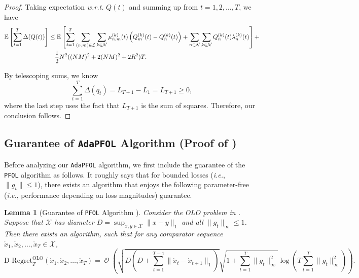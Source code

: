 \documentclass[11pt,fullpage,letterpaper]{article} %
\newtheorem{lemma}[theorem]{Lemma}
\renewcommand{\bm}[1]{#1}%
\renewcommand{\O}{\operatorname{\mathcal O}}
\newcommand{\E}{\operatornamewithlimits{\mathbb{E}}}
\newcommand{\mN}{{\mathcal N}}
\newcommand{\mL}{{\mathcal L}}
\newcommand{\OLOAlg}{\texttt{AdaPFOL}\xspace}
\begin{document}
\begin{proof}
Taking expectation \textit{w.r.t.} $\bm Q(t)$ and summing up from $t=1,2,\ldots,T$, we have
\begin{align*}
\E\left [\sum_{t=1}^T \Delta(\bm Q(t))\right ]&\le \E\left [\sum_{t=1}^T \sum_{(n,m)\in \mL} \sum_{k\in \mN} \mu_{n,m}^{(k)}(t)\left (Q_m^{(k)}(t)-Q_n^{(k)}(t)\right ) + \sum_{n\in \mN} \sum_{k\in \mN} Q_n^{(k)}(t) \lambda_n^{(k)}(t)\right ] + \nonumber \\
&\quad \frac 12 N^2 ((NM)^2+2(NM)^2+2R^2) T.
\end{align*}

By telescoping sums, we know
\begin{equation*}
\sum_{t=1}^T \Delta(\bm q_t)=L_{T+1}-L_1=L_{T+1}\ge 0,
\end{equation*}
where the last step uses the fact that $L_{T+1}$ is the sum of squares. Therefore, our conclusion follows.
\end{proof}

\subsection{Guarantee of \OLOAlg Algorithm (Proof of )}\label{sec:appendix cutkosky}
Before analyzing our \OLOAlg algorithm, we first include the guarantee of the \texttt{PFOL} algorithm \citep{cutkosky2020parameter} as follows. It roughly says that for bounded losses (\textit{i.e.}, $\lVert \bm g_t\rVert\le 1$), there exists an algorithm that enjoys the following parameter-free (\textit{i.e.}, performance depending on loss magnitudes) guarantee.
\begin{lemma}[Guarantee of \texttt{PFOL} Algorithm {\citep[Theorem 6]{cutkosky2020parameter}}]\label{lem:OLO guarantee appendix}\label{lem:OLO guarantee}
Consider the OLO problem in . Suppose that $\mathcal X$ has diameter $D=\sup_{\bm x,\bm y\in \mathcal X}\lVert \bm x-\bm y\rVert_1$ and all $\lVert \bm g_t\rVert_\infty \le 1$. Then there exists an algorithm, such that for any comparator sequence $\mathring{\bm x}_1,\mathring{\bm x}_2,\ldots,\mathring{\bm x}_T\in \mathcal X$,
\begin{equation*}
\text{D-Regret}_T^{\text{OLO}}(\mathring{\bm x}_1,\mathring{\bm x}_2,\ldots,\mathring{\bm x}_T)=\O\left (\sqrt{D \left (D+\sum_{t=1}^{T-1} \lVert \mathring{\bm x}_t-\mathring{\bm x}_{t+1}\rVert_1\right )}\sqrt{1+\sum_{t=1}^T \lVert \bm g_t\rVert_\infty^2}\log \left (T \sum_{t=1}^T \lVert \bm g_t\rVert_\infty^2\right )\right ).
\end{equation*}
\end{lemma}
\end{document}

